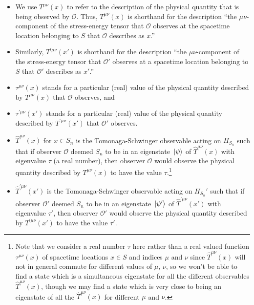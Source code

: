 \begin{itemize}
\item We use $T^{\mu\nu}(x)$ to refer to the description of the physical quantity that is being observed by $\mathcal{O}$. Thus, $T^{\mu\nu}(x)$ is shorthand for the description ``the $\mu\nu$-component of the stress-energy tensor that $\mathcal{O}$ observes at the spacetime location belonging to $S$ that $\mathcal{O}$ describes as  $x$.'' 
\item Similarly,  $T^{\prime\mu\nu}(x')$ is shorthand for the description ``the $\mu\nu$-component of the stress-energy tensor that $\mathcal{O}'$ observes at a spacetime location  belonging to $S$ that $\mathcal{O}'$ describes as $x'$.'' %
% 
\item $\tau^{\mu\nu}(x)$ stands for a particular (real) value of the physical quantity described by $T^{\mu\nu}(x)$ that $\mathcal{O}$ observes, and 
\item $\tau^{\prime\mu\nu}(x')$ stands for a particular (real) value of the physical quantity described by $T^{\prime\mu\nu}(x')$ that $\mathcal{O}'$ observes.%
%
\item $\hat{T}^{\mu\nu}(x)$ for $x\in S_n$ is the Tomonaga-Schwinger observable acting on $H_{S_n}$ such that if observer $\mathcal{O}$ deemed $S_n$ to be in an eigenstate $\ket*{\psi}$ of $\hat{T}^{\mu\nu}(x)$ with eigenvalue $\tau$ (a real number), then observer $\mathcal{O}$ would observe the physical quantity described by  $T^{\mu\nu}(x)$ to have the value $\tau$.\footnote{Note that we consider a real number $\tau$ here rather than a real valued function $\tau^{\mu\nu}(x)$ of spacetime locations $x\in S$ and indices $\mu$ and $\nu$ since $\hat{T}^{\mu\nu}(x)$ will not in general commute for different values of $\mu$, $\nu$, so we won't be able to find a state which is a simultaneous eigenstate for all the different observables $\hat{T}^{\mu\nu}(x)$, though we may find a state which is very close to being an eigenstate of all the  $\hat{T}^{\mu\nu}(x)$ for different $\mu$ and $\nu$.} 
\item $\hat{T}^{\prime\mu\nu}(x')$ is the Tomonaga-Schwinger observable acting on $H_{S_n}'$ such that if observer $\mathcal{O}'$ deemed $S_n$ to be in an eigenstate $\ket*{\psi'}$ of  $\hat{T}^{\prime\mu\nu}(x')$ with eigenvalue $\tau'$, then observer $\mathcal{O}'$ would observe the physical quantity described by  $T^{\prime\mu\nu}(x')$ to have the value $\tau'$.  %

\end{itemize}

